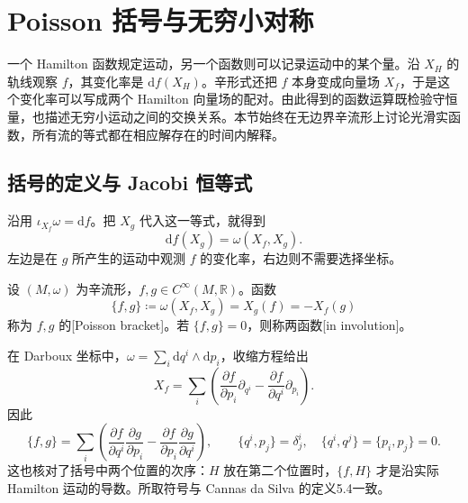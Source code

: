 
% 
% 

\section{Poisson 括号与无穷小对称}
\label{g4:sec:0902}

一个 Hamilton 函数规定运动，另一个函数则可以记录运动中的某个量。沿 \(X_H\) 的轨线观察 \(f\)，其变化率是 \(\mathrm{d}f(X_H)\)。辛形式还把 \(f\) 本身变成向量场 \(X_f\)，于是这个变化率可以写成两个 Hamilton 向量场的配对。由此得到的函数运算既检验守恒量，也描述无穷小运动之间的交换关系。本节始终在无边界辛流形上讨论光滑实函数，所有流的等式都在相应解存在的时间内解释。

\subsection{括号的定义与 Jacobi 恒等式}
\label{g4:subsec:0902:01}

沿用 \(\iota_{X_f}\omega=\mathrm{d}f\)。把 \(X_g\) 代入这一等式，就得到
\[
	\mathrm{d}f(X_g)=\omega(X_f,X_g).
\]
左边是在 \(g\) 所产生的运动中观测 \(f\) 的变化率，右边则不需要选择坐标。

\begin{definition}\label{g4:def:0902:poisson-bracket}
	设 \((M,\omega)\) 为辛流形，\(f,g\in C^\infty(M,\mathbb R)\)。函数
	\begin{equation}\label{g4:eq:0902:poisson-definition}
		\{f,g\}\coloneqq\omega(X_f,X_g)=X_g(f)=-X_f(g)
	\end{equation}
	称为 \(f,g\) 的[Poisson bracket]。若 \(\{f,g\}=0\)，则称两函数[in involution]。
\end{definition}

在 Darboux 坐标中，\(\omega=\sum_i\mathrm{d}q^i\wedge\mathrm{d}p_i\)，收缩方程给出
\[
	X_f=\sum_i\left(
		\frac{\partial f}{\partial p_i}\partial_{q^i}
		-\frac{\partial f}{\partial q^i}\partial_{p_i}
	\right).
\]
因此
\begin{equation}\label{g4:eq:0902:coordinate-bracket}
	\{f,g\}
	=\sum_i\left(
		\frac{\partial f}{\partial q^i}\frac{\partial g}{\partial p_i}
		-\frac{\partial f}{\partial p_i}\frac{\partial g}{\partial q^i}
	\right),
	\qquad
	\{q^i,p_j\}=\delta^i_j,\quad
	\{q^i,q^j\}=\{p_i,p_j\}=0.
\end{equation}
这也核对了括号中两个位置的次序：\(H\) 放在第二个位置时，\(\{f,H\}\) 才是沿实际 Hamilton 运动的导数。所取符号与 Cannas da Silva 的定义5.4一致。\cite[第5.1节，第140--141页]{Cannas2006Symplectic}

